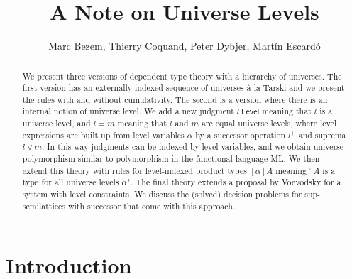 \documentclass[11pt,a4paper]{article}
\theoremstyle{definition}
\def\Level{\mathsf{Level}}
\begin{document}
\title{A Note on Universe Levels}

\author{Marc Bezem, Thierry Coquand, Peter Dybjer, Mart\'in Escard\'o}
\date{}
\maketitle

\begin{abstract}
  We present three versions of dependent type theory with a hierarchy of universes.
  The first version has an externally indexed sequence of universes \`a la Tarski and we present the rules with and without cumulativity.
  The second is a version where there is an internal notion of universe level. We add a new judgment $l\ \Level$ meaning that $l$ is a universe level, and $l = m$ meaning that $l$ and $m$ are equal universe levels, where level expressions are built up from level variables $\alpha$ by a successor operation $l^+$ and suprema $l \vee m$. In this way judgments can be indexed by level variables, and we obtain universe polymorphism similar to polymorphism in the functional language ML.
  We then extend this theory with rules for level-indexed product types $[\alpha]A$ meaning ``$A$ is a type for all universe levels $\alpha$".
The final theory extends a proposal by Voevodsky
  for a system with level constraints. We discuss the (solved) decision problems for sup-semilattices with
successor that come with this approach.
\end{abstract}


\section{Introduction}\label{sec:intros}
\newcommand{\ttt}[1]{\text{\tt #1}}
\end{document}
